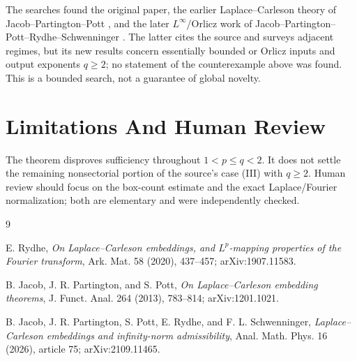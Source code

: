 \documentclass[11pt]{article}
\begin{document}
The searches found the original paper, the earlier Laplace--Carleson theory of
Jacob--Partington--Pott \cite{JPP}, and the later $L^\infty$/Orlicz work of
Jacob--Partington--Pott--Rydhe--Schwenninger \cite{JPPRS}.  The latter cites the
source and surveys adjacent regimes, but its new results concern essentially
bounded or Orlicz inputs and output exponents $q\ge2$; no statement of the
counterexample above was found.  This is a bounded search, not a guarantee of
global novelty.

\section*{Limitations And Human Review}

The theorem disproves sufficiency throughout $1<p\le q<2$.  It does not settle
the remaining nonsectorial portion of the source's case (III) with $q\ge2$.
Human review should focus on the box-count estimate and the exact Laplace/Fourier
normalization; both are elementary and were independently checked.

\begin{thebibliography}{9}

E. Rydhe,
\emph{On Laplace--Carleson embeddings, and $L^p$-mapping properties of the
Fourier transform},
Ark. Mat. 58 (2020), 437--457; arXiv:1907.11583.

B. Jacob, J. R. Partington, and S. Pott,
\emph{On Laplace--Carleson embedding theorems},
J. Funct. Anal. 264 (2013), 783--814; arXiv:1201.1021.

B. Jacob, J. R. Partington, S. Pott, E. Rydhe, and F. L. Schwenninger,
\emph{Laplace--Carleson embeddings and infinity-norm admissibility},
Anal. Math. Phys. 16 (2026), article 75; arXiv:2109.11465.

\end{thebibliography}
\end{document}
